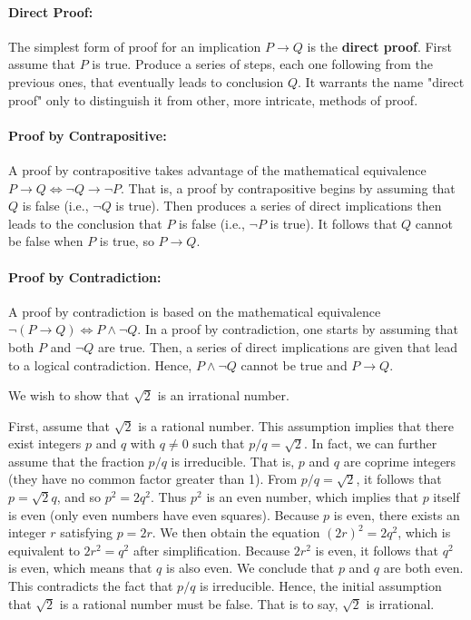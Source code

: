\paragraph{Direct Proof:}

The simplest form of proof for an implication $P \rightarrow Q$ is the \textbf{direct proof}.
First assume that $P$ is true.
Produce a series of steps, each one following from the previous ones, that eventually leads to conclusion $Q$.
It warrants the name "direct proof" only to distinguish it from other, more intricate, methods of proof.

\paragraph{Proof by Contrapositive:}
A proof by contrapositive takes advantage of the mathematical equivalence $P \rightarrow Q \Leftrightarrow \neg Q \rightarrow \neg P$.
That is, a proof by contrapositive begins by assuming that $Q$ is false (i.e., $\neg Q$ is true).
Then produces a series of direct implications then leads to the conclusion that $P$ is false (i.e., $\neg P$ is true).
It follows that $Q$ cannot be false when $P$ is true, so $P \rightarrow Q$.

\paragraph{Proof by Contradiction:}
A proof by contradiction is based on the mathematical equivalence $\neg (P \rightarrow Q) \Leftrightarrow P \wedge \neg Q$.
In a proof by contradiction, one starts by assuming that both $P$ and $\neg Q$ are true.
Then, a series of direct implications are given that lead to a logical contradiction.
Hence, $P \wedge \neg Q$ cannot be true and $P \rightarrow Q$.

\begin{example} \label{example:SquareRoot2}
We wish to show that $\sqrt{2}$ is an irrational number.

First, assume that $\sqrt{2}$ is a rational number.
This assumption implies that there exist integers $p$ and $q$ with $q \neq 0$ such that $p/q = \sqrt{2}$.
In fact, we can further assume that the fraction $p/q$ is irreducible.
That is, $p$ and $q$ are coprime integers (they have no common factor greater than 1).
From $p/q = \sqrt{2}$, it follows that $p = \sqrt{2} q$, and so $p^2 = 2 q^2$.
Thus $p^2$ is an even number, which implies that $p$ itself is even (only even numbers have even squares).
Because $p$ is even, there exists an integer $r$ satisfying $p = 2r$.
We then obtain the equation $(2r)^2 = 2q^2$, which is equivalent to $2r^2 = q^2$ after simplification.
Because $2r^2$ is even, it follows that $q^2$ is even, which means that $q$ is also even.
We conclude that $p$ and $q$ are both even.
This contradicts the fact that $p/q$ is irreducible.
Hence, the initial assumption that $\sqrt{2}$ is a rational number must be false.
That is to say, $\sqrt{2}$ is irrational.
\end{example}


